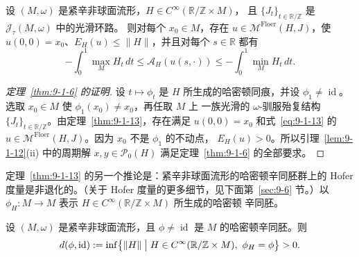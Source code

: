 \begin{theorem}\label{thm:9-1-13}
设 $(M,\omega)$ 是紧辛非球面流形，$H\in C^\infty(\mathbb R/\mathbb Z\times M)$，
且 $\{J_t\}_{t\in\mathbb R/\mathbb Z}$ 是 $\mathcal J_\tau(M,\omega)$ 中的光滑环路。
则对每个 $x_0\in M$，存在 $u\in\mathcal M^{\mathrm{Floer}}(H,J)$，使
$u(0,0)=x_0$、$E_H(u)\le\|H\|$，并且对每个 $s\in\mathbb R$ 都有
\begin{equation}\label{eq:9-1-13}
  -\int_0^1\max_MH_t\,dt
  \le\mathcal A_H(u(s,\cdot))
  \le-\int_0^1\min_MH_t\,dt.
\end{equation}
\end{theorem}

\begin{proof}[定理~\ref{thm:9-1-6} 的证明]
设 $t\mapsto\phi_t$ 是 $H$ 所生成的哈密顿同痕，并设
$\phi_1\ne\operatorname{id}$。选取 $x_0\in M$ 使 $\phi_1(x_0)\ne x_0$，再任取 $M$ 上
一族光滑的 $\omega$-驯服殆复结构
$\{J_t\}_{t\in\mathbb R/\mathbb Z}$。由定理~\ref{thm:9-1-13}，存在满足
$u(0,0)=x_0$ 和式~\eqref{eq:9-1-13} 的
$u\in\mathcal M^{\mathrm{Floer}}(H,J)$。因为 $x_0$ 不是 $\phi_1$ 的不动点，
$E_H(u)>0$。所以引理~\ref{lem:9-1-12}(ii) 中的周期解
$x,y\in\mathcal P_0(H)$ 满足定理~\ref{thm:9-1-6} 的全部要求。
\end{proof}

定理~\ref{thm:9-1-13} 的另一个推论是：紧辛非球面流形的哈密顿辛同胚群上的 Hofer
度量是非退化的。（关于 Hofer 度量的更多细节，见下面第~\ref{sec:9-6} 节。）以
$\phi_H:M\to M$ 表示 $H\in C^\infty(\mathbb R/\mathbb Z\times M)$ 所生成的哈密顿
辛同胚。

\begin{corollary}\label{cor:9-1-14}
设 $(M,\omega)$ 是紧辛非球面流形，且
$\phi\ne\operatorname{id}$ 是 $M$ 的哈密顿辛同胚。则
\[
  d(\phi,\operatorname{id})
  :=\inf\bigl\{\|H\|\bigm|
  H\in C^\infty(\mathbb R/\mathbb Z\times M),\ \phi_H=\phi\bigr\}>0.
\]
\end{corollary}

